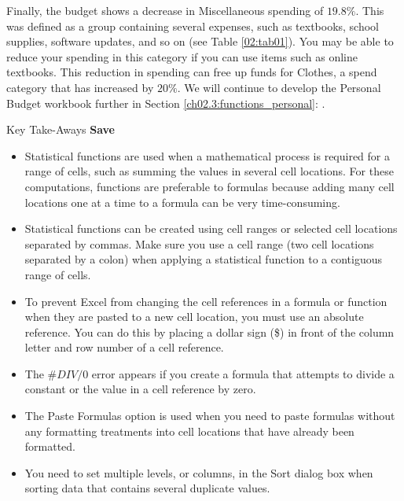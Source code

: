 Finally, the budget shows a decrease in Miscellaneous spending of $ 19.8\% $. This was defined as a group containing several expenses, such as textbooks, school supplies, software updates, and so on (see Table \ref{02:tab01}). You may be able to reduce your spending in this category if you can use items such as online textbooks. This reduction in spending can free up funds for Clothes, a spend category that has increased by $ 20\% $. We will continue to develop the Personal Budget workbook further in Section \ref{ch02.3:functions_personal}: .

\begin{center}
	\begin{tkwbox}{Key Take-Aways}
		\textbf{Save}
		\\
		\begin{itemize}
			\setlength{\itemsep}{0pt}
			\setlength{\parskip}{0pt}
			\setlength{\parsep}{0pt}
			
			\item Statistical functions are used when a mathematical process is required for a range of cells, such as summing the values in several cell locations. For these computations, functions are preferable to formulas because adding many cell locations one at a time to a formula can be very time-consuming.
			\item Statistical functions can be created using cell ranges or selected cell locations separated by commas. Make sure you use a cell range (two cell locations separated by a colon) when applying a statistical function to a
			contiguous range of cells.
			\item To prevent Excel from changing the cell references in a formula or function when they are pasted to a new cell location, you must use an absolute reference. You can do this by placing a dollar sign (\$) in front of the column letter and row number of a cell reference.
			\item The $ \#DIV/0 $ error appears if you create a formula that attempts to divide a constant or the value in a cell reference by zero.
			\item The Paste Formulas option is used when you need to paste formulas without any formatting treatments into cell locations that have already been formatted.
			\item You need to set multiple levels, or columns, in the Sort dialog box when sorting data that contains several duplicate values.
			
		\end{itemize}
	\end{tkwbox}
\end{center}

